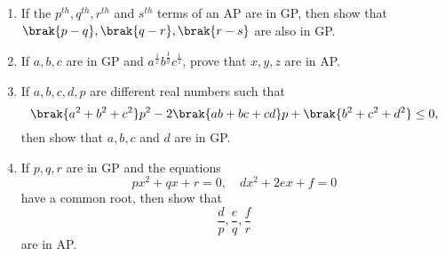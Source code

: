 \begin{enumerate}[label=\thesubsection.\arabic*.,ref=\thesubsection.\theenumi]
\item If the $p^{th}, q^{th}, r^{th}$ and $s^{th}$ terms of an AP are in GP, then show that $\brak{p-q},\brak{q-r},\brak{r-s}$ are also in GP.
\item If $a,b,c$ are in GP and $a^{\frac{1}{x}}b^{\frac{1}{y}}c^{\frac{1}{z}}$, prove that $x,y,z$ are in AP.
\item If $a, b, c, d, p$ are different real numbers such that 
	$$\brak{a^2+b^2+c^2}p^2-2\brak{ab+bc+cd}p+\brak{b^2+c^2+d^2} \le 0,$$ then show that $a,b,c$ and $d$ are in GP.
\item If $p,q,r$ are in GP and the equations 
	$$px^2+qx+r = 0, \quad dx^2+2ex+f = 0$$
	have a common root, then show that
	$$\frac{d}{p},\frac{e}{q},\frac{f}{r}$$ are in AP.
\end{enumerate}
